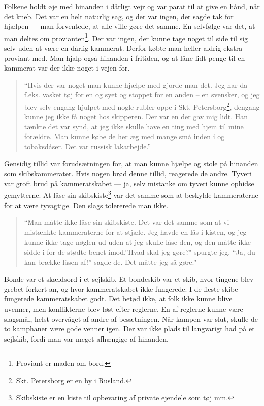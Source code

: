 Folkene holdt øje med hinanden i dårligt vejr og var parat til at give
en hånd, når det kneb. Det var en helt naturlig sag, og der var ingen,
der sagde tak for hjælpen --- man forventede, at alle ville gøre det
samme. En selvfølge var det, at man deltes om provianten\footnote{Proviant
  er maden om bord.}. Der var ingen, der kunne tage noget til side til
sig selv uden at være en dårlig kammerat. Derfor købte man heller aldrig
ekstra proviant med. Man hjalp også hinanden i fritiden, og at låne lidt
penge til en kammerat var der ikke noget i vejen for.

\begin{quote}
``Hvis der var noget man kunne hjælpe med gjorde man det. Jeg har da
f.eks. vasket tøj for en og syet og stoppet for en anden -- en svensker,
og jeg blev selv engang hjulpet med nogle rubler oppe i Skt.
Petersborg\footnote{Skt. Petersborg er en by i Rusland.}, dengang kunne
jeg ikke få noget hos skipperen. Der var en der gav mig lidt. Han tænkte
det var synd, at jeg ikke skulle have en ting med hjem til mine
forældre. Man kunne købe de her æg med mange små inden i og tobaksdåser.
Det var russisk lakarbejde.''
\end{quote}

Gensidig tillid var forudsætningen for, at man kunne hjælpe og stole på
hinanden som skibskammerater. Hvis nogen brød denne tillid, reagerede de
andre. Tyveri var groft brud på kammeratskabet --- ja, selv mistanke om
tyveri kunne ophidse gemytterne. At låse sin skibskiste\footnote{Skibskiste
  er en kiste til opbevaring af private ejendele som tøj mm.} var det
samme som at beskylde kammeraterne for at være tyvagtige. Den slags
tolererede man ikke.

\begin{quote}
``Man måtte ikke låse sin skibskiste. Det var det samme som at vi
mistænkte kammeraterne for at stjæle. Jeg havde en lås i kisten, og jeg
kunne ikke tage nøglen ud uden at jeg skulle låse den, og den måtte ikke
sidde i for de stødte benet imod.''Hvad skal jeg gøre?" spurgte jeg.
``Ja, du kan brække låsen af!'' sagde de. Det måtte jeg så gøre."
\end{quote}

Bonde var et skældsord i et sejlskib. Et bondeskib var et skib, hvor
tingene blev grebet forkert an, og hvor kammeratskabet ikke fungerede. I
de fleste skibe fungerede kammeratskabet godt. Det betød ikke, at folk
ikke kunne blive uvenner, men konflikterne blev løst efter reglerne. En
af reglerne kunne være slagsmål, helst overvåget af andre af
besætningen. Når kampen var slut, skulle de to kamphaner være gode
venner igen. Der var ikke plads til langvarigt had på et sejlskib, fordi
man var meget afhængige af hinanden.

